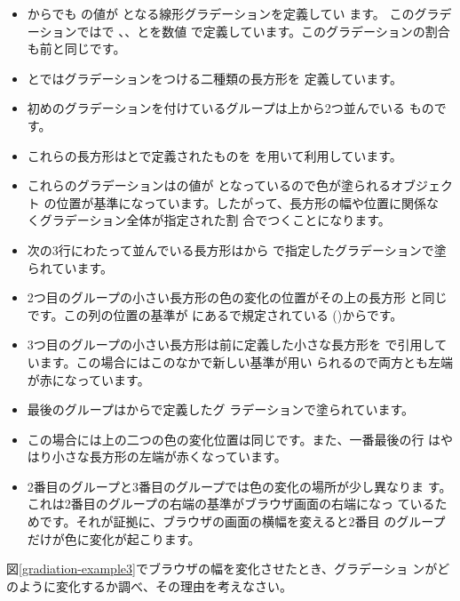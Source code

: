 \begin{itemize}
\item {}からでも
の値が
となる線形グラデーションを定義してい
ます。
%
このグラデーションではで
、、とを数値
で定義しています。このグラデーションの割合も前と同じです。
\item {}とではグラデーションをつける二種類の長方形を
      定義しています。
 \item 初めのグラデーションを付けているグループは上から2つ並んでいる
       ものです。
 \item これらの長方形はとで定義されたものを
       を用いて利用しています。
 \item これらのグラデーションはの値が
となっているので色が塗られるオブジェクト
       の位置が基準になっています。したがって、長方形の幅や位置に関係な
       くグラデーション全体が指定された割
       合でつくことになります。
 \item 次の3行にわたって並んでいる長方形はから
       で指定したグラデーションで塗られています。
 \item 2つ目のグループの小さい長方形の色の変化の位置がその上の長方形
       と同じです。この列の位置の基準が
       にあるで規定されている
       ()からです。
 \item 3つ目のグループの小さい長方形は前に定義した小さな長方形を
       で引用しています。この場合にはこのなかで新しい基準が用い
       られるので両方とも左端が赤になっています。
  \item 最後のグループはからで定義したグ
	ラデーションで塗られています。
 \item この場合には上の二つの色の変化位置は同じです。また、一番最後の行
       はやはり小さな長方形の左端が赤くなっています。
 \item 2番目のグループと3番目のグループでは色の変化の場所が少し異なりま
       す。これは2番目のグループの右端の基準がブラウザ画面の右端になっ
       ているためです。それが証拠に、ブラウザの画面の横幅を変えると2番目
       のグループだけが色に変化が起こります。
\end{itemize}
\begin{Problem}\upshape
 図\ref{gradiation-example3}でブラウザの幅を変化させたとき、グラデーショ
 ンがどのように変化するか調べ、その理由を考えなさい。
\end{Problem}
